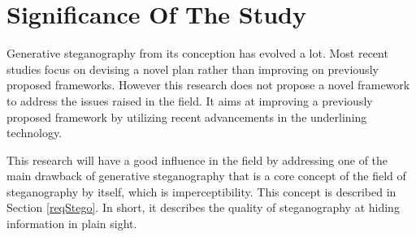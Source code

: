 \documentclass[../main/main.tex]{subfiles}
\begin{document}
	\section{Significance Of The Study}
	Generative steganography from its conception has evolved a lot. Most recent studies focus on devising a novel plan rather than improving on previously proposed frameworks. However this research does not propose a novel framework to address the issues raised in the field. It aims at improving a previously proposed framework by utilizing recent advancements in the underlining technology. 
	
	This research will have a good influence in the field by addressing one of the main drawback of generative steganography that is a core concept of the field of steganography by itself, which is imperceptibility. This concept is described in Section \ref{reqStego}. In short, it describes the quality of steganography at hiding information in plain sight. 
\end{document}
